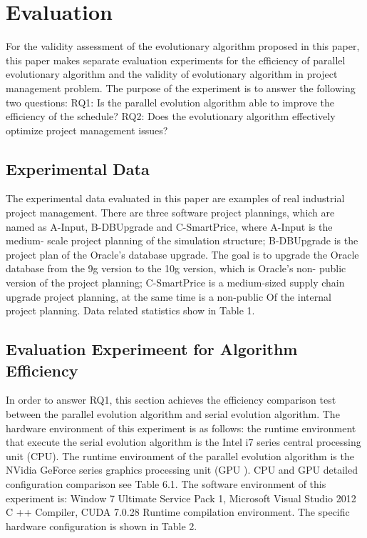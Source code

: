 \section{Evaluation}
%
For the validity assessment of the evolutionary algorithm proposed in this 
paper, this paper makes separate evaluation experiments for the efficiency of 
parallel evolutionary algorithm and the validity of evolutionary algorithm in 
project management problem. The purpose of the experiment is to answer the 
following two questions:
RQ1: Is the parallel evolution algorithm able to improve the efficiency of 
the schedule?
RQ2: Does the evolutionary algorithm effectively optimize project management 
issues?

\subsection{Experimental Data}
The experimental data evaluated in this paper are examples of real industrial 
project management. There are three software project plannings, which are 
named as A-Input, B-DBUpgrade and C-SmartPrice, where A-Input is the medium-
scale project planning of the simulation structure; B-DBUpgrade is the 
project plan of the Oracle’s database upgrade. The goal is to upgrade the 
Oracle database from the 9g version to the 10g version, which is Oracle's non-
public version of the project planning; C-SmartPrice is a medium-sized supply 
chain upgrade project planning, at the same time is a non-public Of the 
internal project planning\cite{ren}. Data related statistics show in Table 1.

\subsection{Evaluation Experimeent for Algorithm Efficiency}
In order to answer RQ1, this section achieves the efficiency comparison test 
between the parallel evolution algorithm and serial evolution algorithm. The 
hardware environment of this experiment is as follows: the runtime 
environment that execute the serial evolution algorithm is the Intel i7 
series central processing unit (CPU). The runtime environment of the parallel 
evolution algorithm is the NVidia GeForce series graphics processing unit (GPU
). CPU and GPU detailed configuration comparison see Table 6.1. The software 
environment of this experiment is: Window 7 Ultimate Service Pack 1, 
Microsoft Visual Studio 2012 C ++ Compiler, CUDA 7.0.28 Runtime compilation 
environment. The specific hardware configuration is shown in Table 2.


